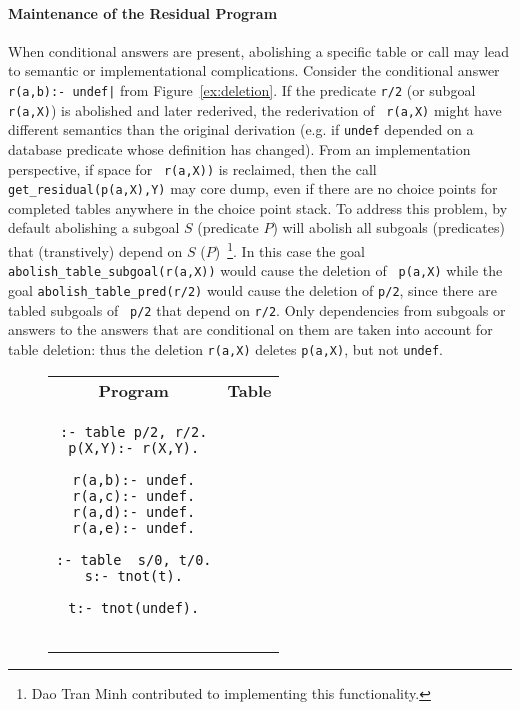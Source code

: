\begin{description}
\paragraph{Maintenance of the Residual Program}
When conditional answers are present, abolishing a specific table or
call may lead to semantic or implementational complications.  Consider
the conditional answer {\tt r(a,b):- undef|} from
Figure~\ref{ex:deletion}.  If the predicate {\tt r/2} (or subgoal {\tt
  r(a,X)}) is abolished and later rederived, the rederivation of {\tt
  r(a,X)} might have different semantics than the original derivation
(e.g. if {\tt undef} depended on a database predicate whose definition
has changed).  From an implementation perspective, if space for {\tt
  r(a,X))} is reclaimed, then the call {\tt get\_residual(p(a,X),Y)}
may core dump, even if there are no choice points for completed tables
anywhere in the choice point stack.  To address this problem, by
default abolishing a subgoal $S$ (predicate $P$) will abolish all
subgoals (predicates) that (transtively) depend on $S$
($P$)~\footnote{Dao Tran Minh contributed to implementing this
  functionality.}.  In this case the goal {\tt
  abolish\_table\_subgoal(r(a,X))} would cause the deletion of {\tt
  p(a,X)} while the goal {\tt abolish\_table\_pred(r/2)} would cause
the deletion of {\tt p/2}, since there are tabled subgoals of {\tt
  p/2} that depend on {\tt r/2}.  Only dependencies from subgoals or
answers to the answers that are conditional on them are taken into
account for table deletion: thus the deletion {\tt r(a,X)} deletes
{\tt p(a,X)}, but not {\tt undef}.

\begin{figure}[htb]
\begin{center}
\begin{tabular}{cc}\hline \hline
\rule[-2ex]{0ex}{5ex} \textbf{Program} & \textbf{Table} \\
\begin{minipage}{14.5em}
\begin{verbatim}
:- table p/2, r/2.
p(X,Y):- r(X,Y).

r(a,b):- undef.
r(a,c):- undef.
r(a,d):- undef.
r(a,e):- undef.

:- table  s/0, t/0.
s:- tnot(t).

t:- tnot(undef).


\end{verbatim}
\end{minipage}
\end{tabular}
\end{center}
\end{figure}
\end{description}
